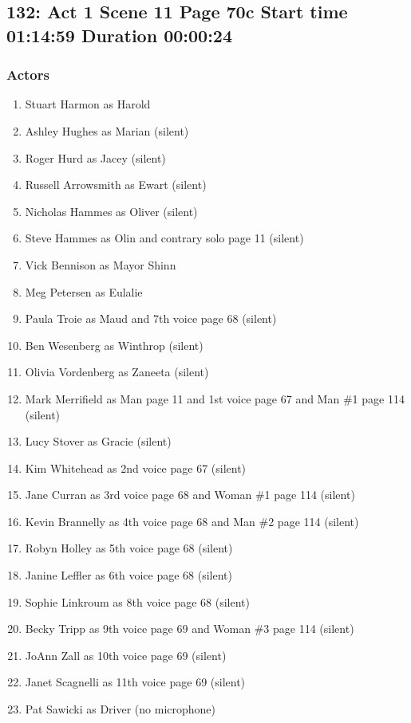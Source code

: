\subsection{132: Act 1 Scene 11 Page 70c Start time 01:14:59 Duration 00:00:24}

\subsubsection{Actors}
\begin{enumerate}
\item Stuart Harmon as Harold
\item Ashley Hughes as Marian (silent)
\item Roger Hurd as Jacey (silent)
\item Russell Arrowsmith as Ewart (silent)
\item Nicholas Hammes as Oliver (silent)
\item Steve Hammes as Olin and contrary solo page 11 (silent)
\item Vick Bennison as Mayor Shinn
\item Meg Petersen as Eulalie
\item Paula Troie as Maud and 7th voice page 68 (silent)
\item Ben Wesenberg as Winthrop (silent)
\item Olivia Vordenberg as Zaneeta (silent)
\item Mark Merrifield as Man page 11 and 1st voice page 67 and Man \#1 page 114 (silent)
\item Lucy Stover as Gracie (silent)
\item Kim Whitehead as 2nd voice page 67 (silent)
\item Jane Curran as 3rd voice page 68 and Woman \#1 page 114 (silent)
\item Kevin Brannelly as 4th voice page 68 and Man \#2 page 114 (silent)
\item Robyn Holley as 5th voice page 68 (silent)
\item Janine Leffler as 6th voice page 68 (silent)
\item Sophie Linkroum as 8th voice page 68 (silent)
\item Becky Tripp as 9th voice page 69 and Woman \#3 page 114 (silent)
\item JoAnn Zall as 10th voice page 69 (silent)
\item Janet Scagnelli as 11th voice page 69 (silent)
\item Pat Sawicki as Driver (no microphone)
\end{enumerate}

